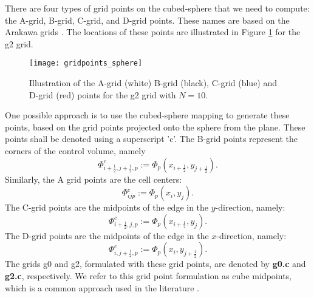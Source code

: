 There are four types of grid points on the cubed-sphere that we need to compute: the A-grid, B-grid, C-grid, and D-grid points.
These names are based on the Arakawa grids \citep{arakawa:1977}.
The locations of these points are illustrated in Figure \ref{chp-cs-gridpoints} for the g2 grid.
\begin{figure}[!htb]
	\centering
	\texttt{[image: gridpoints\_sphere]}
	\caption{Illustration of the A-grid (white) B-grid (black), C-grid (blue) and D-grid (red) points 
		for the g2 grid with $N=10$.\label{chp-cs-gridpoints}}
\end{figure}

One possible approach is to use the cubed-sphere mapping to generate these points, based on the grid points projected onto the sphere from the plane.
These points shall be denoted using a superscript 'c'.
The B-grid points represent the corners of the control volume, namely
\begin{equation}
	\Phi_{i+\frac{1}{2},j+\frac{1}{2},p}^c := \Phi_p(x_{i+\frac{1}{2}},y_{j+\frac{1}{2}}).
\end{equation}
Similarly, the A grid points are the cell centers:
\begin{equation}
	\Phi_{ijp}^c := \Phi_p(x_{i},y_{j}).
\end{equation}
The C-grid points are the midpoints of the edge in the $y$-direction, namely:
\begin{equation}
	\Phi_{i+\frac{1}{2},j,p}^c := \Phi_p(x_{i+\frac{1}{2}},y_{j}).
\end{equation}
The D-grid points are the midpoints of the edge in the $x$-direction, namely:
\begin{equation}
	\Phi_{i,j+\frac{1}{2},p}^c := \Phi_p(x_{i},y_{j+\frac{1}{2}}).
\end{equation}
The grids g0 and g2, formulated with these grid points, are denoted by \textbf{g0.c} and \textbf{g2.c}, respectively.
We refer to this grid point formulation as cube midpoints, which is a common approach used in the literature \citep{guo:2014,katta:2015,katta:2015b,nair:2005,ullrich:2016}.

